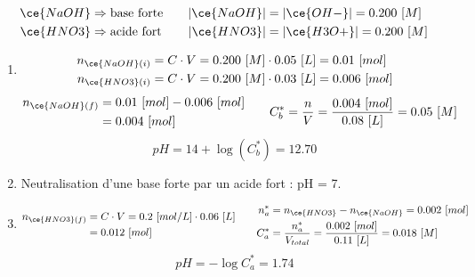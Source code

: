 \documentclass[
  11pt,
  a4paper,
  openany]{book}
\begin{document}
\begin{Answer}

\[
\begin{split}
\ce{NaOH} &\Rightarrow \text{base forte} \\
\ce{HNO3} &\Rightarrow \text{acide fort}
\end{split}
\qquad
\begin{split}
|\ce{NaOH}| &= |\ce{OH-}| = 0.200\ [M] \\
|\ce{HNO3}| &= |\ce{H3O+}| = 0.200\ [M]
\end{split}
\]

\begin{enumerate}
\def\labelenumi{\alph{enumi}.}
\item
  \[
  \begin{split}
  n_{\ce{NaOH}(i)} &= C \cdot V = 0.200\ [M] \cdot 0.05\ [L] = 0.01\ [mol] \\
  n_{\ce{HNO3}(i)} &= C \cdot V = 0.200\ [M] \cdot 0.03\ [L] = 0.006\ [mol]
  \end{split}
  \]
  \[
  \begin{split}
  n_{\ce{NaOH}(f)} &= 0.01\ [mol] - 0.006\ [mol] \\
    &= 0.004\ [mol]
  \end{split}
  \qquad
  \begin{split}
  C_{b}^{*} = \frac{n}{V} = \frac{0.004\ [mol]}{0.08\ [L]} = 0.05\ [M]
  \end{split}
  \]
  \[
  pH = 14 + \log(C_{b}^{*}) = 12.70
  \]
\item
  Neutralisation d'une base forte par un acide fort : pH = 7.
\item
  \[
  \begin{split}
  n_{\ce{HNO3}(f)} &= C \cdot V = 0.2\ [mol/L] \cdot 0.06\ [L] \\
    &= 0.012\ [mol]
  \end{split}
  \qquad
  \begin{split}
  n_{a}^{*} &= n_{\ce{HNO3}} - n_{\ce{NaOH}} = 0.002\ [mol] \\
  C_{a}^{*} &= \frac{n_{a}^{*}}{V_{total}} = \frac{0.002\ [mol]}{0.11\ [L]} = 0.018\ [M]
  \end{split}
  \]
  \[
  pH = - \log C_{a}^{*} = 1.74
  \]
\end{enumerate}

\clearpage

\end{Answer}
\end{document}
